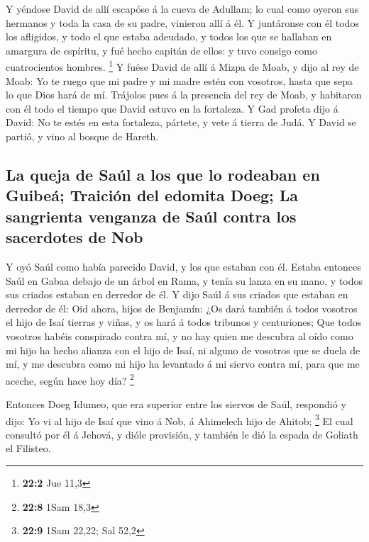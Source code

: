  Y yéndose David de allí escapóse á la cueva de Adullam; lo
cual como oyeron sus hermanos y toda la casa de su padre, vinieron allí
á él.  Y juntáronse con él todos los afligidos, y todo el
que estaba adeudado, y todos los que se hallaban en amargura de
espíritu, y fué hecho capitán de ellos: y tuvo consigo como
cuatrocientos hombres. \footnote{\textbf{22:2} Jue 11,3}  Y
fuése David de allí á Mizpa de Moab, y dijo al rey de Moab: Yo te ruego
que mi padre y mi madre estén con vosotros, hasta que sepa lo que Dios
hará de mí.  Trájolos pues á la presencia del rey de Moab, y
habitaron con él todo el tiempo que David estuvo en la fortaleza.
 Y Gad profeta dijo á David: No te estés en esta fortaleza,
pártete, y vete á tierra de Judá. Y David se partió, y vino al bosque de
Hareth.

\hypertarget{la-queja-de-sauxfal-a-los-que-lo-rodeaban-en-guibeuxe1-traiciuxf3n-del-edomita-doeg-la-sangrienta-venganza-de-sauxfal-contra-los-sacerdotes-de-nob}{%
\subsection{La queja de Saúl a los que lo rodeaban en Guibeá; Traición
del edomita Doeg; La sangrienta venganza de Saúl contra los sacerdotes
de
Nob}\label{la-queja-de-sauxfal-a-los-que-lo-rodeaban-en-guibeuxe1-traiciuxf3n-del-edomita-doeg-la-sangrienta-venganza-de-sauxfal-contra-los-sacerdotes-de-nob}}

 Y oyó Saúl como había parecido David, y los que estaban con
él. Estaba entonces Saúl en Gabaa debajo de un árbol en Rama, y tenía su
lanza en su mano, y todos sus criados estaban en derredor de él.
 Y dijo Saúl á sus criados que estaban en derredor de él:
Oid ahora, hijos de Benjamín: ¿Os dará también á todos vosotros el hijo
de Isaí tierras y viñas, y os hará á todos tribunos y centuriones;
 Que todos vosotros habéis conspirado contra mí, y no hay
quien me descubra al oído como mi hijo ha hecho alianza con el hijo de
Isaí, ni alguno de vosotros que se duela de mí, y me descubra como mi
hijo ha levantado á mi siervo contra mí, para que me aceche, según hace
hoy día? \footnote{\textbf{22:8} 1Sam 18,3}

 Entonces Doeg Idumeo, que era superior entre los siervos de
Saúl, respondió y dijo: Yo vi al hijo de Isaí que vino á Nob, á
Ahimelech hijo de Ahitob; \footnote{\textbf{22:9} 1Sam 22,22; Sal 52,2}
 El cual consultó por él á Jehová, y dióle provisión, y
también le dió la espada de Goliath el Filisteo.

